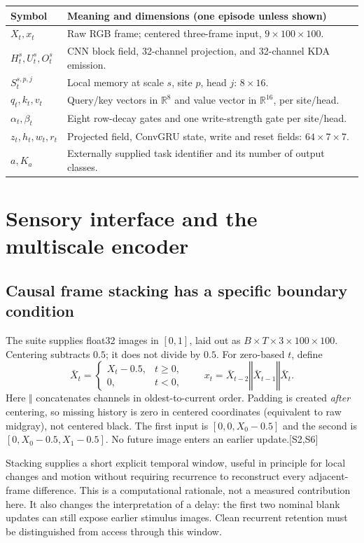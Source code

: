 \documentclass[10pt,letterpaper]{article}
\newcommand{\R}{\mathbb{R}}
\newcommand{\cat}{\mathbin\Vert}
\newcommand{\src}[1]{\textcolor{accent}{\textsf{[#1]}}}
\newcommand{\psection}[1]{\clearpage\section{#1}}
\begin{document}
\vspace{-5pt}
\begin{tabularx}{\linewidth}{@{}lX@{}}\toprule
Symbol & Meaning and dimensions (one episode unless shown)\\\midrule
$X_t,x_t$ & Raw RGB frame; centered three-frame input, $9\times100\times100$.\\
$H_t^s,U_t^s,O_t^s$ & CNN block field, 32-channel projection, and 32-channel KDA emission.\\
$S_t^{s,p,j}$ & Local memory at scale $s$, site $p$, head $j$: $8\times16$.\\
$q_t,k_t,v_t$ & Query/key vectors in $\R^8$ and value vector in $\R^{16}$, per site/head.\\
$\alpha_t,\beta_t$ & Eight row-decay gates and one write-strength gate per site/head.\\
$z_t,h_t,w_t,r_t$ & Projected field, ConvGRU state, write and reset fields: $64\times7\times7$.\\
$a,K_a$ & Externally supplied task identifier and its number of output classes.\\\bottomrule
\end{tabularx}

\psection{Sensory interface and the multiscale encoder}
\subsection{Causal frame stacking has a specific boundary condition}
The suite supplies float32 images in $[0,1]$, laid out as $B\times T\times3\times100\times100$. Centering subtracts $0.5$; it does not divide by $0.5$. For zero-based $t$, define
\begin{equation}
\bar X_t=\begin{cases}X_t-0.5,&t\geq0,\\0,&t<0,\end{cases}
\qquad x_t=\bar X_{t-2}\cat\bar X_{t-1}\cat\bar X_t .
\end{equation}
Here $\cat$ concatenates channels in oldest-to-current order. Padding is created \emph{after} centering, so missing history is zero in centered coordinates (equivalent to raw midgray), not centered black. The first input is $[0,0,X_0-0.5]$ and the second is $[0,X_0-0.5,X_1-0.5]$. No future image enters an earlier update.\src{S2,S6}

Stacking supplies a short explicit temporal window, useful in principle for local changes and motion without requiring recurrence to reconstruct every adjacent-frame difference. This is a computational rationale, not a measured contribution here. It also changes the interpretation of a delay: the first two nominal blank updates can still expose earlier stimulus images. Clean recurrent retention must be distinguished from access through this window.
\end{document}
